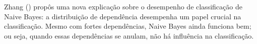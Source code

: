 Zhang (\citeyear{zhang2004}) propôs uma nova explicação sobre o desempenho de classificação de Naive Bayes: a distribuição de dependência desempenha um papel crucial na classificação. Mesmo com fortes dependências, Naive Bayes ainda funciona bem; ou seja, quando essas dependências se anulam, não há influência na classificação. 











